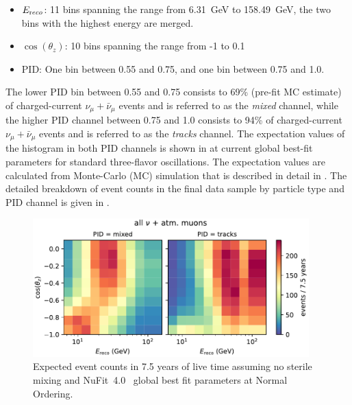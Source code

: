 \begin{itemize}
    \item $E_{\rm reco}$: 11 bins spanning the range from 6.31~GeV to 158.49~GeV, the two bins with the highest energy are merged.
    \item $\cos(\theta_z)$: 10 bins spanning the range from -1 to 0.1
    \item PID: One bin between 0.55 and 0.75, and one bin between 0.75 and 1.0.
\end{itemize}

The lower PID bin between 0.55 and 0.75 consists to 69\%  (pre-fit MC estimate) of charged-current $\nu_\mu + \bar{\nu}_\mu$ events and is referred to as the \emph{mixed} channel, while the higher PID channel between 0.75 and 1.0 consists to 94\% of charged-current $\nu_\mu + \bar{\nu}_\mu$ events and is referred to as the \emph{tracks} channel. The expectation values of the histogram in both PID channels is shown in  at current global best-fit parameters for standard three-flavor oscillations. The expectation values are calculated from Monte-Carlo (MC) simulation that is described in detail in . The detailed breakdown of event counts in the final data sample by particle type and PID channel is given in .

\begin{figure}
    \centering
    \includegraphics[width=0.95\textwidth]{figures/measurement/simulation_and_data/binning/plot_maps_total.pdf}
    \caption{Expected event counts in 7.5 years of live time assuming no sterile mixing and NuFit~4.0~\cite{nufit40} global best fit parameters at Normal Ordering.}
    \label{fig:nominal-hist-null-hypo}
\end{figure}

